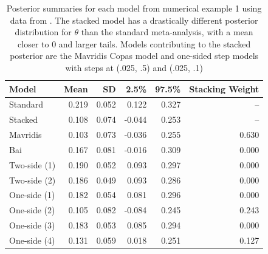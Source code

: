 \documentclass[12pt]{article}   	%
\numberwithin{equation}{section}
\begin{document}
\begin{table}[ht]
\centering
\begin{tabular}{lrrrrr}
  \hline
Model & Mean & SD & 2.5\% & 97.5\% & Stacking Weight \\ 
  \hline
Standard & 0.219 & 0.052 & 0.122 & 0.327 & -- \\ 
  Stacked & 0.108 & 0.074 & -0.044 & 0.253 & -- \\ 
  Mavridis & 0.103 & 0.073 & -0.036 & 0.255 & 0.630 \\ 
  Bai & 0.167 & 0.081 & -0.016 & 0.309 & 0.000 \\ 
  Two-side (1) & 0.190 & 0.052 & 0.093 & 0.297 & 0.000 \\ 
  Two-side (2) & 0.186 & 0.049 & 0.093 & 0.286 & 0.000 \\ 
  One-side (1) & 0.182 & 0.054 & 0.081 & 0.296 & 0.000 \\ 
  One-side (2) & 0.105 & 0.082 & -0.084 & 0.245 & 0.243 \\ 
  One-side (3) & 0.183 & 0.053 & 0.085 & 0.294 & 0.000 \\ 
  One-side (4) & 0.131 & 0.059 & 0.018 & 0.251 & 0.127 \\ 
   \hline
\end{tabular}
\caption{Posterior summaries for each model from numerical example 1 using data from \citet{hackshaw1997}. The stacked model has a drastically different posterior distribution for $\theta$ than the standard meta-analysis, with a mean closer to 0 and larger tails. Models contributing to the stacked posterior are the Mavridis Copas model and one-sided step models with steps at (.025, .5) and (.025, .1)}
\label{tab:hackshaw}
\end{table}
\end{document}
